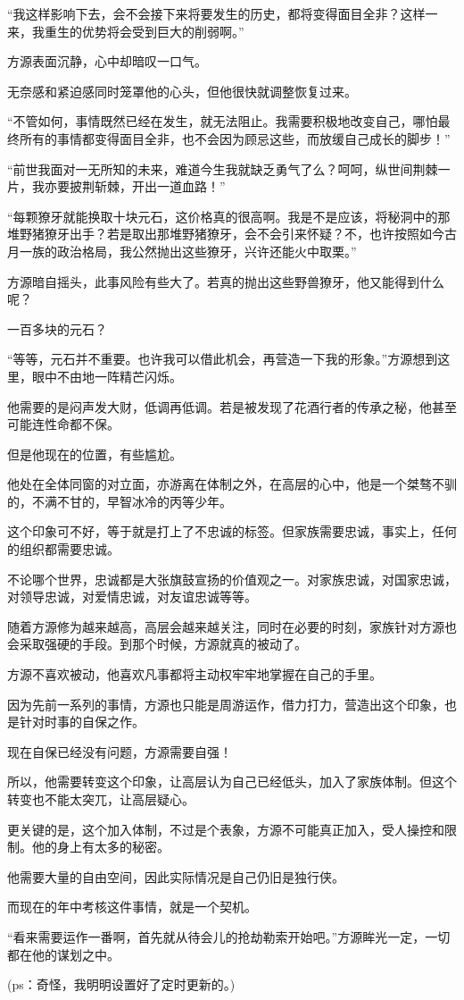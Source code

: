 \begin{this_body}
“我这样影响下去，会不会接下来将要发生的历史，都将变得面目全非？这样一来，我重生的优势将会受到巨大的削弱啊。”

方源表面沉静，心中却暗叹一口气。

无奈感和紧迫感同时笼罩他的心头，但他很快就调整恢复过来。

“不管如何，事情既然已经在发生，就无法阻止。我需要积极地改变自己，哪怕最终所有的事情都变得面目全非，也不会因为顾忌这些，而放缓自己成长的脚步！”

“前世我面对一无所知的未来，难道今生我就缺乏勇气了么？呵呵，纵世间荆棘一片，我亦要披荆斩棘，开出一道血路！”

“每颗獠牙就能换取十块元石，这价格真的很高啊。我是不是应该，将秘洞中的那堆野猪獠牙出手？若是取出那堆野猪獠牙，会不会引来怀疑？不，也许按照如今古月一族的政治格局，我公然抛出这些獠牙，兴许还能火中取栗。”

方源暗自摇头，此事风险有些大了。若真的抛出这些野兽獠牙，他又能得到什么呢？

一百多块的元石？

“等等，元石并不重要。也许我可以借此机会，再营造一下我的形象。”方源想到这里，眼中不由地一阵精芒闪烁。

他需要的是闷声发大财，低调再低调。若是被发现了花酒行者的传承之秘，他甚至可能连性命都不保。

但是他现在的位置，有些尴尬。

他处在全体同窗的对立面，亦游离在体制之外，在高层的心中，他是一个桀骜不驯的，不满不甘的，早智冰冷的丙等少年。

这个印象可不好，等于就是打上了不忠诚的标签。但家族需要忠诚，事实上，任何的组织都需要忠诚。

不论哪个世界，忠诚都是大张旗鼓宣扬的价值观之一。对家族忠诚，对国家忠诚，对领导忠诚，对爱情忠诚，对友谊忠诚等等。

随着方源修为越来越高，高层会越来越关注，同时在必要的时刻，家族针对方源也会采取强硬的手段。到那个时候，方源就真的被动了。

方源不喜欢被动，他喜欢凡事都将主动权牢牢地掌握在自己的手里。

因为先前一系列的事情，方源也只能是周游运作，借力打力，营造出这个印象，也是针对时事的自保之作。

现在自保已经没有问题，方源需要自强！

所以，他需要转变这个印象，让高层认为自己已经低头，加入了家族体制。但这个转变也不能太突兀，让高层疑心。

更关键的是，这个加入体制，不过是个表象，方源不可能真正加入，受人操控和限制。他的身上有太多的秘密。

他需要大量的自由空间，因此实际情况是自己仍旧是独行侠。

而现在的年中考核这件事情，就是一个契机。

“看来需要运作一番啊，首先就从待会儿的抢劫勒索开始吧。”方源眸光一定，一切都在他的谋划之中。

(ps：奇怪，我明明设置好了定时更新的。)

\end{this_body}

